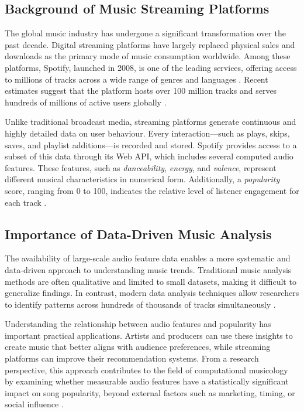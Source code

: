 \documentclass[12pt,a4paper]{article}
\begin{document}
\subsection{Background of Music Streaming Platforms}

The global music industry has undergone a significant transformation over
the past decade. Digital streaming platforms have largely replaced
physical sales and downloads as the primary mode of music consumption
worldwide. Among these platforms, Spotify, launched in 2008, is one of the leading services, offering access to millions of tracks
across a wide range of genres and languages \citep{spotify2023}. Recent
estimates suggest that the platform hosts over 100 million tracks and
serves hundreds of millions of active users globally \citep{ifpi2023}.

Unlike traditional broadcast media, streaming platforms generate
continuous and highly detailed data on user behaviour. Every
interaction---such as plays, skips, saves, and playlist additions—is
recorded and stored. Spotify provides access to a subset of this data
through its Web API, which includes several computed audio features.
These features, such as \textit{danceability}, \textit{energy}, and
\textit{valence}, represent different musical characteristics in
numerical form. Additionally, a \textit{popularity} score, ranging from
0 to 100, indicates the relative level of listener engagement for each
track \citep{spotifyapi2023}.

\subsection{Importance of Data-Driven Music Analysis}

The availability of large-scale audio feature data enables a more
systematic and data-driven approach to understanding music trends.
Traditional music analysis methods are often qualitative and limited to
small datasets, making it difficult to generalize findings. In contrast,
modern data analysis techniques allow researchers to identify patterns
across hundreds of thousands of tracks simultaneously \citep{schedl2014}.

Understanding the relationship between audio features and popularity has
important practical applications. Artists and producers can use these
insights to create music that better aligns with audience preferences,
while streaming platforms can improve their recommendation systems.
From a research perspective, this approach contributes to the field of
computational musicology by examining whether measurable audio features
have a statistically significant impact on song popularity, beyond
external factors such as marketing, timing, or social influence
\citep{lamere2014,interiano2018}.
\end{document}

